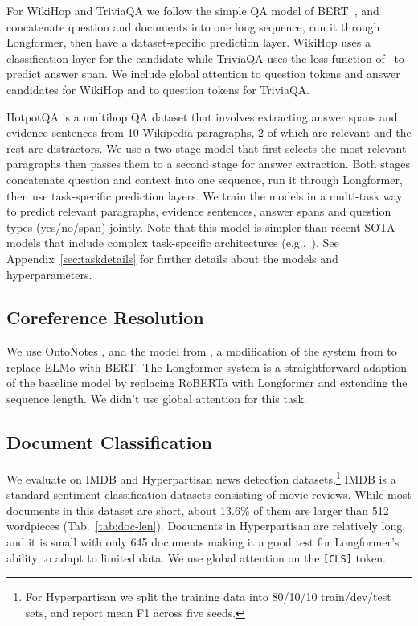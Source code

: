 \documentclass[11pt,a4paper]{article}
\newcommand{\model}{Longformer\xspace}
\begin{document}
For WikiHop and TriviaQA we follow the simple QA model of BERT~\cite{bert}, and concatenate question and documents into one long sequence, run it through \model, then have a dataset-specific prediction layer. WikiHop uses a classification layer for the candidate while TriviaQA uses the loss function of~\citet{Clark2017SimpleAE} to predict answer span.  We include global attention to question tokens and answer candidates for WikiHop and to question tokens for TriviaQA.

HotpotQA is a multihop QA dataset that involves extracting answer spans and evidence sentences from 10 Wikipedia paragraphs, 2 of which are relevant and the rest are distractors. We use a two-stage model
that first selects the most relevant paragraphs then passes them to a second stage for answer extraction. Both stages concatenate question and context into one sequence, run it through \model, then use task-specific prediction layers. 
We train the models in a multi-task way to predict relevant paragraphs, evidence sentences, answer spans and question types (yes/no/span) jointly.
Note that this model is simpler than recent SOTA models that include complex task-specific architectures (e.g.,~\cite{Tu2019SelectAA,Chen2019MultihopQA,Tu2020GraphSN,quark2020}). 
See Appendix~\ref{sec:taskdetails} for further details about the models and hyperparameters.

\subsection{Coreference Resolution}
We use OntoNotes \cite{pradhan-etal-2012-conll}, and the model from \citet{joshi-etal-2019-bert}, a modification of the system from \citet{lee-etal-2018-higher} to replace ELMo with BERT.
The \model system is a straightforward adaption of the baseline model by replacing RoBERTa with \model and extending the sequence length.
We didn't use global attention for this task. 

\subsection{Document Classification }
We evaluate on IMDB \cite{imdb} and Hyperpartisan news detection \cite{hyperpartisan} datasets.\footnote{
For Hyperpartisan we split the training data into 80/10/10 train/dev/test sets, and report mean F1 across five seeds.} IMDB is a standard sentiment classification datasets consisting of movie reviews. While most documents in this dataset are short, about 13.6\% of them are larger than 512 wordpieces (Tab.~\ref{tab:doc-len}).
Documents in Hyperpartisan are relatively long, and it is small with only 645 documents making it a good test for \model's ability to adapt to limited data. We use global attention 
on the \texttt{[CLS]} token. 
\end{document}
